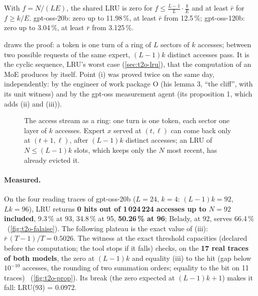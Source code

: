 \begin{corollaire}\label{cor:t2o-fraction}
With $f = N/(LE)$, the shared LRU is zero for $f \le \frac{L-1}{L}\cdot\frac{k}{E}$ and at least $\bar r$ for $f \ge k/E$. gpt-oss-20b: zero up to 11.98\,\%, at least $\bar r$ from 12.5\,\%; gpt-oss-120b: zero up to 3.04\,\%, at least $\bar r$ from 3.125\,\%.
\end{corollaire}

 draws the proof: a token is one turn of a ring of $L$ sectors of $k$ accesses; between two possible requests of the same expert, $(L-1)k$ distinct accesses pass. It is the cyclic sequence, LRU's worst case (\cref{sec:t2o-lru}), that the computation of an MoE produces by itself. Point (i) was proved twice on the same day, independently: by the engineer of work package O (his lemma 3, \enquote{the cliff}, with its unit witness) and by the gpt-oss measurement agent (its proposition 1, which adds (ii) and (iii)).

\begin{figure}[ht]
\centering
\SchemaCchAnneau
\caption[The cliff of the shared LRU]{The access stream as a ring: one turn is one token, each sector one layer of $k$ accesses. Expert $x$ served at $(t, \ell)$ can come back only at $(t+1, \ell)$, after $(L-1)k$ distinct accesses; an LRU of $N \le (L-1)k$ slots, which keeps only the $N$ most recent, has already evicted it.}
\label{fig:t2o-anneau}
\end{figure}

\paragraph{Measured.} On the four reading traces of gpt-oss-20b ($L = 24$, $k = 4$: $(L-1)k = 92$, $Lk = 96$), LRU returns \textbf{0 hits out of 1\,024\,224 accesses up to $N = 92$ included}, 9.3\,\% at 93, 34.8\,\% at 95, \textbf{50.26\,\% at 96}; Belady, at 92, serves 66.4\,\% \mes~(\cref{fig:t2o-falaise}). The following plateau is the exact value of (iii): $\bar r\,(T-1)/T = 0.5026$. The witness at the exact threshold capacities (declared before the computation; the tool stops if it falls) checks, on the \textbf{17 real traces of both models}, the zero at $(L-1)k$ and equality (iii) to the hit (gap below $10^{-10}$ accesses, the rounding of two summation orders; equality to the bit on 11 traces) \mes~(\cref{fig:t2o-prop}). Its break (the zero expected at $(L-1)k + 1$) makes it fall: LRU(93) = 0.0972.


